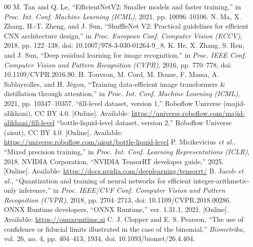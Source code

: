 \documentclass[conference]{IEEEtran}
\begin{document}
\begin{thebibliography}{00}
 M. Tan and Q. Le, ``EfficientNetV2: Smaller models and faster training,'' in \textit{Proc. Int. Conf. Machine Learning (ICML)}, 2021, pp. 10096--10106.
 N. Ma, X. Zhang, H.-T. Zheng, and J. Sun, ``ShuffleNet V2: Practical guidelines for efficient CNN architecture design,'' in \textit{Proc. European Conf. Computer Vision (ECCV)}, 2018, pp. 122--138, doi: 10.1007/978-3-030-01264-9\_8.
 K. He, X. Zhang, S. Ren, and J. Sun, ``Deep residual learning for image recognition,'' in \textit{Proc. IEEE Conf. Computer Vision and Pattern Recognition (CVPR)}, 2016, pp. 770--778, doi: 10.1109/CVPR.2016.90.
 H. Touvron, M. Cord, M. Douze, F. Massa, A. Sablayrolles, and H. Jégou, ``Training data-efficient image transformers \& distillation through attention,'' in \textit{Proc. Int. Conf. Machine Learning (ICML)}, 2021, pp. 10347--10357.
 ``fill-level dataset, version 1,'' Roboflow Universe (majid-alikhani), CC BY 4.0. [Online]. Available: \url{https://universe.roboflow.com/majid-alikhani/fill-level}
 ``bottle-liquid-level dataset, version 2,'' Roboflow Universe (aisut), CC BY 4.0. [Online]. Available: \url{https://universe.roboflow.com/aisut/bottle-liquid-level}
 P. Micikevicius \textit{et al.}, ``Mixed precision training,'' in \textit{Proc. Int. Conf. Learning Representations (ICLR)}, 2018.
 NVIDIA Corporation, ``NVIDIA TensorRT developer guide,'' 2025. [Online]. Available: \url{https://docs.nvidia.com/deeplearning/tensorrt/}
 B. Jacob \textit{et al.}, ``Quantization and training of neural networks for efficient integer-arithmetic-only inference,'' in \textit{Proc. IEEE/CVF Conf. Computer Vision and Pattern Recognition (CVPR)}, 2018, pp. 2704--2713, doi: 10.1109/CVPR.2018.00286.
 ONNX Runtime developers, ``ONNX Runtime,'' ver. 1.31.1, 2021. [Online]. Available: \url{https://onnxruntime.ai}
 C. J. Clopper and E. S. Pearson, ``The use of confidence or fiducial limits illustrated in the case of the binomial,'' \textit{Biometrika}, vol. 26, no. 4, pp. 404--413, 1934, doi: 10.1093/biomet/26.4.404.
\end{thebibliography}
\end{document}
